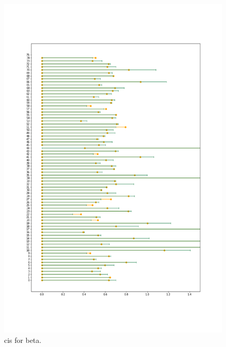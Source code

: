 \begin{figure}
    \centering
    \includegraphics[scale=0.37]{pictures/Sensitivity/ci_lim_beta_zoom2.png}
    \caption{cis for beta. }
    \label{fig:sensitivity_ci_lim_beta_zoom2}
\end{figure}